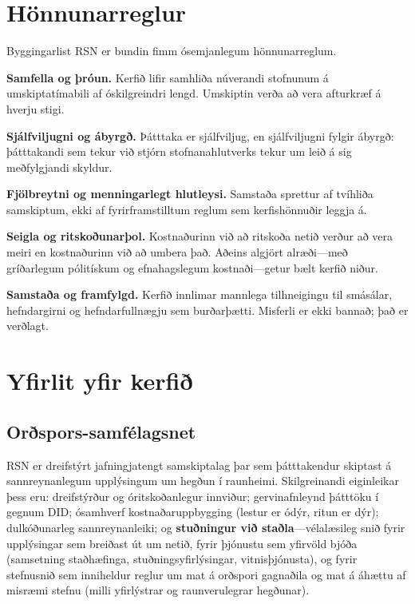 \documentclass[11pt,a4paper,twocolumn]{article}
\begin{document}
\section{Hönnunarreglur}

Byggingarlist RSN er bundin fimm ósemjanlegum hönnunarreglum.

\textbf{Samfella og þróun.} Kerfið lifir samhliða núverandi stofnunum á umskiptatímabili af óskilgreindri lengd. Umskiptin verða að vera afturkræf á hverju stigi.

\textbf{Sjálfviljugni og ábyrgð.} Þátttaka er sjálfviljug, en sjálfviljugni fylgir ábyrgð: þátttakandi sem tekur við stjórn stofnanahlutverks tekur um leið á sig meðfylgjandi skyldur.

\textbf{Fjölbreytni og menningarlegt hlutleysi.} Samstaða sprettur af tvíhliða samskiptum, ekki af fyrirframstilltum reglum sem kerfishönnuðir leggja á.

\textbf{Seigla og ritskoðunarþol.} Kostnaðurinn við að ritskoða netið verður að vera meiri en kostnaðurinn við að umbera það. Aðeins algjört alræði---með gríðarlegum pólitískum og efnahagslegum kostnaði---getur bælt kerfið niður.

\textbf{Samstaða og framfylgd.} Kerfið innlimar mannlega tilhneigingu til smásálar, hefndargirni og hefndarfullnægju sem burðarþætti. Misferli er ekki bannað; það er verðlagt.

\section{Yfirlit yfir kerfið}

\subsection{Orðspors-samfélagsnet}

RSN er dreifstýrt jafningjatengt samskiptalag þar sem þátttakendur skiptast á sannreynanlegum upplýsingum um hegðun í raunheimi. Skilgreinandi eiginleikar þess eru: dreifstýrður og óritskoðanlegur innviður; gervinafnleynd þátttöku í gegnum DID; ósamhverf kostnaðaruppbygging (lestur er ódýr, ritun er dýr); dulkóðunarleg sannreynanleiki; og \textbf{stuðningur við staðla}---vélalæsileg snið fyrir upplýsingar sem breiðast út um netið, fyrir þjónustu sem yfirvöld bjóða (samsetning staðhæfinga, stuðningsyfirlýsingar, vitnisþjónusta), og fyrir stefnusnið sem inniheldur reglur um mat á orðspori gagnaðila og mat á áhættu af misræmi stefnu (milli yfirlýstrar og raunverulegrar hegðunar).
\end{document}
